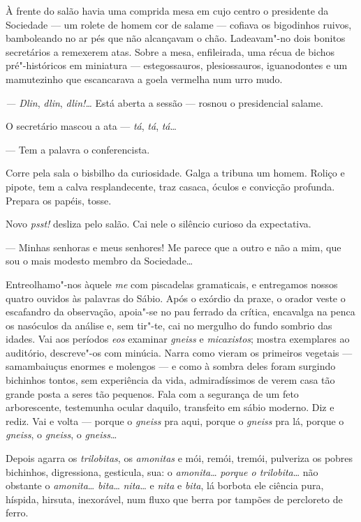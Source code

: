 À frente do salão havia uma comprida mesa em cujo centro o presidente da
Sociedade --- um rolete de homem cor de salame --- cofiava os bigodinhos
ruivos, bamboleando no ar pés que não alcançavam o chão. Ladeavam"-no
dois bonitos secretários a remexerem atas. Sobre a mesa, enfileirada,
uma récua de bichos pré"-históricos em miniatura --- estegossauros,
plesiossauros, iguanodontes e um mamutezinho que escancarava a goela
vermelha num urro mudo.

\emph{--- Dlin}, \emph{dlin}, \emph{dlin!\ldots{}} Está aberta a sessão ---
rosnou o presidencial salame.

O secretário mascou a ata --- \emph{tá}, \emph{tá}, \emph{tá}\ldots{}

--- Tem a palavra o conferencista.

Corre pela sala o bisbilho da curiosidade. Galga a tribuna um homem.
Roliço e pipote, tem a calva resplandecente, traz casaca, óculos e
convicção profunda. Prepara os papéis, tosse.

Novo \emph{psst!} desliza pelo salão. Cai nele o silêncio curioso da
expectativa.

--- Minhas senhoras e meus senhores! Me parece que a outro e não a mim,
que sou o mais modesto membro da Sociedade\ldots{}

Entreolhamo"-nos àquele \emph{me} com piscadelas gramaticais, e
entregamos nossos quatro ouvidos às palavras do Sábio. Após o exórdio da
praxe, o orador veste o escafandro da observação, apoia"-se no pau
ferrado da crítica, encavalga na penca os nasóculos da análise e, sem
tir"-te, cai no mergulho do fundo sombrio das idades. Vai aos períodos
\emph{eos} examinar \emph{gneiss} e \emph{micaxistos}; mostra exemplares
ao auditório, descreve"-os com minúcia. Narra como vieram os primeiros
vegetais --- samambaiuçus enormes e molengos --- e como à sombra deles
foram surgindo bichinhos tontos, sem experiência da vida, admiradíssimos
de verem casa tão grande posta a seres tão pequenos. Fala com a
segurança de um feto arborescente, testemunha ocular daquilo, transfeito
em sábio moderno. Diz e rediz. Vai e volta --- porque o \emph{gneiss}
pra aqui, porque o \emph{gneiss} pra lá, porque o \emph{gneiss}, o
\emph{gneiss}, o \emph{gneiss}\ldots{}

Depois agarra os \emph{trilobitas}, os \emph{amonitas} e mói, remói,
tremói, pulveriza os pobres bichinhos, digressiona, gesticula, sua: o
\emph{amonita}\ldots{} \emph{porque o trilobita}\ldots{} não obstante o
\emph{amonita}\ldots{} \emph{bita}\ldots{} \emph{nita}\ldots{} e \emph{nita} e
\emph{bita}, lá borbota ele ciência pura, híspida, hirsuta, inexorável,
num fluxo que berra por tampões de percloreto de ferro.

